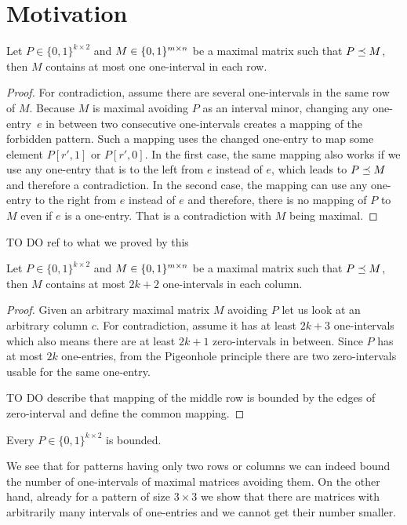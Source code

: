 \section{Motivation}
\begin{thm}
Let $P\in\{0,1\}^{k\times2}$ and $M\in\{0,1\}^{m\times n}$ be a  maximal matrix such that $P\preceq M$, then $M$ contains at most one one-interval in each row.
\end{thm}
\begin{proof}
For contradiction, assume there are several one-intervals in the same row of $M$. Because $M$ is maximal avoiding $P$ as an interval minor, changing any one-entry~$e$ in between two consecutive one-intervals creates a mapping of the forbidden pattern. Such a mapping uses the changed one-entry to map some element $P[r',1]$ or $P[r',0]$. In the first case, the same mapping also works if we use any one-entry that is to the left from $e$ instead of $e$, which leads to $P\preceq M$ and therefore a contradiction. In the second case, the mapping can use any one-entry to the right from $e$ instead of $e$ and therefore, there is no mapping of $P$ to $M$ even if $e$ is a one-entry. That is a contradiction with $M$ being maximal.
\end{proof}
TO DO ref to what we proved by this
\begin{thm}
\label{smallintnum}
Let $P\in\{0,1\}^{k\times 2}$ and $M\in\{0,1\}^{m\times n}$ be a maximal matrix such that $P\preceq M$, then $M$ contains at most $2k+2$ one-intervals in each column.
\end{thm}
\begin{proof}
Given an arbitrary maximal matrix $M$ avoiding $P$ let us look at an arbitrary column $c$. For contradiction, assume it has at least $2k+3$ one-intervals which also means there are at least $2k+1$ zero-intervals in between. Since $P$ has at most $2k$ one-entries, from the Pigeonhole principle there are two zero-intervals usable for the same one-entry.

TO DO describe that mapping of the middle row is bounded by the edges of zero-interval and define the common mapping.
\end{proof}
\begin{cor}
Every $P\in\{0,1\}^{k\times 2}$ is bounded.
\end{cor}
We see that for patterns having only two rows or columns we can indeed bound the number of one-intervals of maximal matrices avoiding them. On the other hand, already for a pattern of size $3\times3$ we show that there are matrices with arbitrarily many intervals of one-entries and we cannot get their number smaller.

